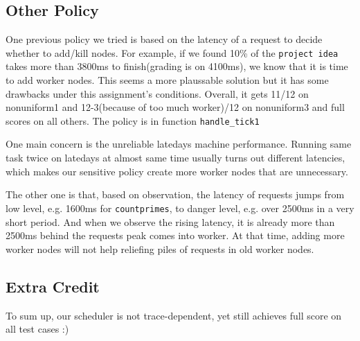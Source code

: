 \documentclass[11pt]{article}
\newcommand{\code}[1]{\texttt{#1}}
\begin{document}

\subsection{Other Policy} %
\label{sub:other_pol}
One previous policy we tried is based on the latency of a request to decide whether to add/kill nodes.
For example, if we found 10\% of the \code{project idea} takes more than 3800ms to finish(grading is on 4100ms),
we know that it is time to add worker nodes.
This seems a more plaussable solution but it has some drawbacks under this assignment's conditions.
Overall, it gets 11/12 on nonuniform1 and 12-3(because of too much worker)/12 on nonuniform3 and full scores on all others.
The policy is in function \code{handle\_tick1}

One main concern is the unreliable latedays machine performance.
Running same task twice on latedays at almost same time usually turns out different latencies, which makes our sensitive policy create more worker nodes that are unnecessary.

The other one is that, based on observation, the latency of requests jumps from low level, e.g. 1600ms for \code{countprimes}, to danger level, e.g. over 2500ms in a very short period.
And when we observe the rising latency, it is already more than 2500ms behind the requests peak comes into worker.
At that time, adding more worker nodes will not help reliefing piles of requests in old worker nodes.

\subsection{Extra Credit} %
To sum up, our scheduler is not trace-dependent, yet still achieves full score on all test cases :)
\end{document}
